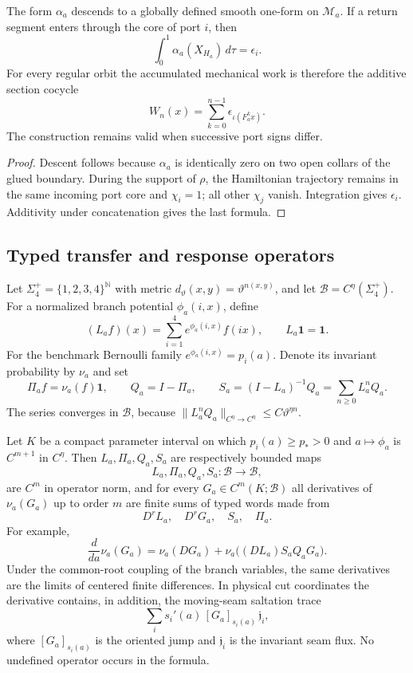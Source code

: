 \begin{proposition}
\label{prop:r5-a1-work}
The form \(\alpha_a\) descends to a globally defined smooth one-form on
\(\mathcal M_a\).  If a return segment enters through the core of port \(i\),
then
\[
 \int_{0}^{1}\alpha_a(X_{H_a})\,d\tau=\epsilon_i.
\]
For every regular orbit the accumulated mechanical work is therefore the
additive section cocycle
\[
 W_n(x)=\sum_{k=0}^{n-1}\epsilon_{\iota(F_a^kx)}.
\]
The construction remains valid when successive port signs differ.
\end{proposition}

\begin{proof}
Descent follows because \(\alpha_a\) is identically zero on two open collars
of the glued boundary.  During the support of \(\rho\), the Hamiltonian
trajectory remains in the same incoming port core and \(\chi_i=1\); all
other \(\chi_j\) vanish.  Integration gives \(\epsilon_i\).  Additivity under
concatenation gives the last formula.
\end{proof}

\subsection{Typed transfer and response operators}

Let \(\Sigma_4^+=\{1,2,3,4\}^{\mathbb N}\) with metric
\(d_\vartheta(x,y)=\vartheta^{n(x,y)}\), and let
\(\mathscr B=C^\eta(\Sigma_4^+)\).  For a normalized branch potential
\(\phi_a(i,x)\), define
\[
 (L_af)(x)=\sum_{i=1}^4e^{\phi_a(i,x)}f(ix),
 \qquad L_a\mathbf1=\mathbf1.
\]
For the benchmark Bernoulli family
\(e^{\phi_a(i,x)}=p_i(a)\).  Denote its invariant probability by \(\nu_a\)
and set
\[
 \Pi_af=\nu_a(f)\mathbf1,
 \qquad Q_a=I-\Pi_a,
 \qquad S_a=(I-L_a)^{-1}Q_a=\sum_{n\ge0}L_a^nQ_a.
\]
The series converges in \(\mathscr B\), because
\(\|L_a^nQ_a\|_{C^\eta\to C^\eta}\le C\vartheta^{\eta n}\).

\begin{theorem}
\label{thm:r5-a1-response}
Let \(K\) be a compact parameter interval on which
\(p_i(a)\ge p_*>0\) and \(a\mapsto\phi_a\) is \(C^{m+1}\) in
\(C^\eta\).  Then \(L_a,\Pi_a,Q_a,S_a\) are respectively bounded maps
\[
 L_a,\Pi_a,Q_a,S_a:\mathscr B\longrightarrow\mathscr B,
\]
are \(C^m\) in operator norm, and for every \(G_a\in C^m(K;\mathscr B)\)
all derivatives of \(\nu_a(G_a)\) up to order \(m\) are finite sums of typed
words made from
\[
 D^rL_a,\quad D^rG_a,\quad S_a,\quad\Pi_a.
\]
For example,
\[
 \frac d{da}\nu_a(G_a)
 =\nu_a(DG_a)+\nu_a\bigl((DL_a)S_aQ_aG_a\bigr).
\]
Under the common-root coupling of the branch variables, the same derivatives
are the limits of centered finite differences.  In physical cut coordinates
the derivative contains, in addition, the moving-seam saltation trace
\[
 \sum_i s_i'(a)\,[G_a]_{s_i(a)}\,\mathfrak j_i,
\]
where \([G_a]_{s_i(a)}\) is the oriented jump and \(\mathfrak j_i\) is the
invariant seam flux.  No undefined operator occurs in the formula.
\end{theorem}

